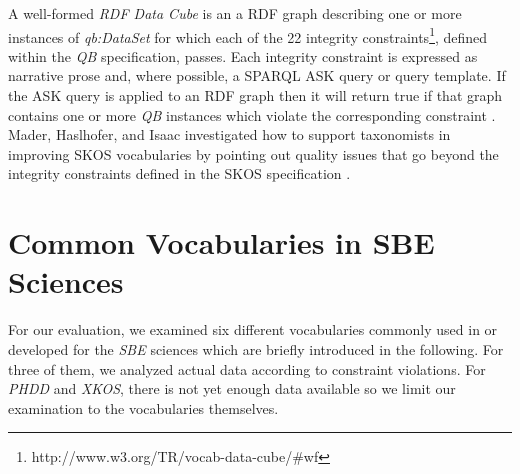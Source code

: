 \documentclass{llncs}
\begin{document}

A well-formed \emph{RDF Data Cube} is an a RDF graph describing one or more instances of \emph{qb:DataSet} for which each of the 22 integrity constraints\footnote{http://www.w3.org/TR/vocab-data-cube/\#wf}, defined within the \emph{QB} specification, passes.
Each integrity constraint is expressed as narrative prose and, where possible, a SPARQL ASK query or query template. 
If the ASK query is applied to an RDF graph then it will return true if that graph contains one or more \emph{QB} instances which violate the corresponding constraint \cite{CyganiakReynolds2014}.
Mader, Haslhofer, and Isaac investigated how to support
taxonomists in improving SKOS vocabularies by pointing out quality
issues that go beyond the integrity constraints defined in the SKOS specification \cite{MaderHaslhoferIsaac2012}.
 
\section{Common Vocabularies in SBE Sciences}
\label{rdf-representation}


For our evaluation, we examined six different vocabularies commonly used in or developed for the \emph{SBE} sciences which are briefly introduced in the following. For three of them, we analyzed actual data according to constraint violations. For \emph{PHDD} and \emph{XKOS}, there is not yet enough data available so we limit our examination to the vocabularies themselves.
\end{document}
